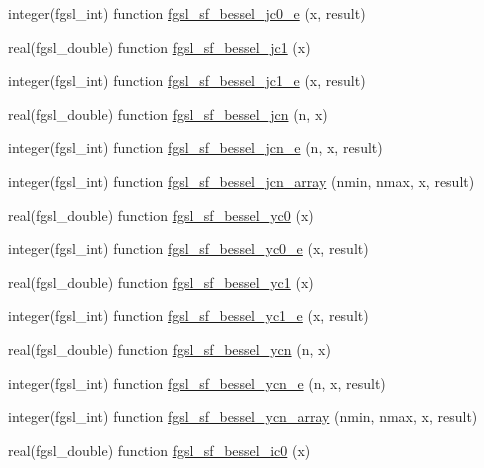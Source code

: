 \begin{DoxyCompactItemize}
\item 
integer(fgsl\+\_\+int) function \hyperlink{specfunc_8finc_a9f07ea6b51f0159a9f0a4605684494e8}{fgsl\+\_\+sf\+\_\+bessel\+\_\+jc0\+\_\+e} (x, result)
\item 
real(fgsl\+\_\+double) function \hyperlink{specfunc_8finc_ad97100dab3f0815f10173d61f1a305dd}{fgsl\+\_\+sf\+\_\+bessel\+\_\+jc1} (x)
\item 
integer(fgsl\+\_\+int) function \hyperlink{specfunc_8finc_a474165b4ec20444e49b8bea32be9dc16}{fgsl\+\_\+sf\+\_\+bessel\+\_\+jc1\+\_\+e} (x, result)
\item 
real(fgsl\+\_\+double) function \hyperlink{specfunc_8finc_a30a63ae95bae3d7985833566a9a4e494}{fgsl\+\_\+sf\+\_\+bessel\+\_\+jcn} (n, x)
\item 
integer(fgsl\+\_\+int) function \hyperlink{specfunc_8finc_afc52092a2e06b4be193e617c4bdec3ea}{fgsl\+\_\+sf\+\_\+bessel\+\_\+jcn\+\_\+e} (n, x, result)
\item 
integer(fgsl\+\_\+int) function \hyperlink{specfunc_8finc_a93875ce80eff9c84d5099c5aaf06ebf6}{fgsl\+\_\+sf\+\_\+bessel\+\_\+jcn\+\_\+array} (nmin, nmax, x, result)
\item 
real(fgsl\+\_\+double) function \hyperlink{specfunc_8finc_a2a8653b50716c1da1479f3f6cfcdfe4e}{fgsl\+\_\+sf\+\_\+bessel\+\_\+yc0} (x)
\item 
integer(fgsl\+\_\+int) function \hyperlink{specfunc_8finc_a76da6cb8aec48174a2bbbf7651c51593}{fgsl\+\_\+sf\+\_\+bessel\+\_\+yc0\+\_\+e} (x, result)
\item 
real(fgsl\+\_\+double) function \hyperlink{specfunc_8finc_a35ddf553357b6cc58f9eb7ac0331262c}{fgsl\+\_\+sf\+\_\+bessel\+\_\+yc1} (x)
\item 
integer(fgsl\+\_\+int) function \hyperlink{specfunc_8finc_a6e7e769252b3a8869dcf48a143d6885d}{fgsl\+\_\+sf\+\_\+bessel\+\_\+yc1\+\_\+e} (x, result)
\item 
real(fgsl\+\_\+double) function \hyperlink{specfunc_8finc_a7c5fdbf056fca8d635d35b32e8e9e3ac}{fgsl\+\_\+sf\+\_\+bessel\+\_\+ycn} (n, x)
\item 
integer(fgsl\+\_\+int) function \hyperlink{specfunc_8finc_a5e9c9671afb1c2e0ec7d830d48d0aae0}{fgsl\+\_\+sf\+\_\+bessel\+\_\+ycn\+\_\+e} (n, x, result)
\item 
integer(fgsl\+\_\+int) function \hyperlink{specfunc_8finc_acbeff6d1931ac060ec162d6abf87759e}{fgsl\+\_\+sf\+\_\+bessel\+\_\+ycn\+\_\+array} (nmin, nmax, x, result)
\item 
real(fgsl\+\_\+double) function \hyperlink{specfunc_8finc_ab670cac105db3ebe0b3ddd64826808e1}{fgsl\+\_\+sf\+\_\+bessel\+\_\+ic0} (x)

\end{DoxyCompactItemize}
